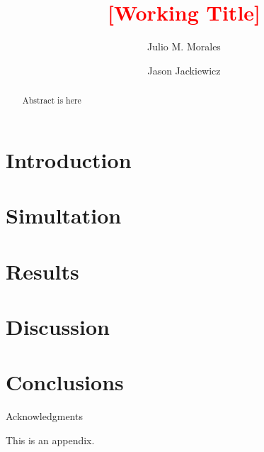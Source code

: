 \documentclass[twocolumn]{aastex7}
\newcommand{\todo}[1]{\textcolor{red}{[#1]}}
\begin{document}
\title{\todo{Working Title}}

\author[0000-0001-7525-7423]{Julio M. Morales} %

\author[0000-0001-9659-7486]{Jason Jackiewicz}%

\begin{abstract}
Abstract is here 
\end{abstract}


\NewPageAfterKeywords{}

\section{Introduction}\label{sec:intro}

\section{Simultation}\label{sec:sim}

\section{Results}\label{sec:results}

\section{Discussion}\label{sec:disc}

\section{Conclusions}\label{sec:conc}


\begin{acknowledgments}
    Acknowledgments
\end{acknowledgments}\label{sec:ack}

\appendix\label{sec:appendix}

This is an appendix.
\end{document}
